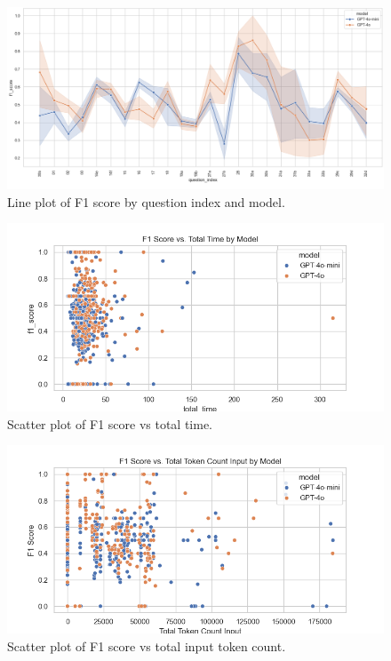                 \begin{figure}[H]
                    \centering
                    \includegraphics[width=0.75\linewidth]{images_exp2/line_f1_by_question_index_and_model.png}
                    \caption{Line plot of F1 score by question index and model.}
                    \label{fig:line_f1_by_question_index_and_model}
                \end{figure}

                \begin{figure}[H]
                    \centering
                    \includegraphics[scale=0.75]{images_exp2/scatter_f1_vs_total_time.png}
                    \caption{Scatter plot of F1 score vs total time.}
                    \label{fig:scatter_f1_vs_total_time}
                \end{figure}

                \begin{figure}[H]
                    \centering
                    \includegraphics[scale=0.75]{images_exp2/scatter_f1_vs_total_token_count_input.png}
                    \caption{Scatter plot of F1 score vs total input token count.}
                    \label{fig:scatter_f1_vs_total_token_count_input}
                \end{figure}

